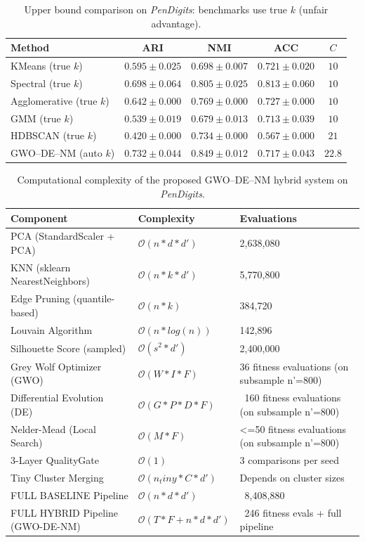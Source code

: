 \begin{table}[htbp]
\centering\small
\caption{Upper bound comparison on \textit{PenDigits}: benchmarks use true $k$ (unfair advantage).}
\label{tab:upper_pendigits}
\begin{tabular}{lcccc}
\toprule
Method & ARI & NMI & ACC & $C$ \\
\midrule
KMeans (true $k$) & $0.595 \pm 0.025$ & $0.698 \pm 0.007$ & $0.721 \pm 0.020$ & $10$ \\
Spectral (true $k$) & $0.698 \pm 0.064$ & $0.805 \pm 0.025$ & $0.813 \pm 0.060$ & $10$ \\
Agglomerative (true $k$) & $0.642 \pm 0.000$ & $0.769 \pm 0.000$ & $0.727 \pm 0.000$ & $10$ \\
GMM (true $k$) & $0.539 \pm 0.019$ & $0.679 \pm 0.013$ & $0.713 \pm 0.039$ & $10$ \\
HDBSCAN (true $k$) & $0.420 \pm 0.000$ & $0.734 \pm 0.000$ & $0.567 \pm 0.000$ & $21$ \\
\midrule
GWO--DE--NM (auto $k$) & $\mathbf{0.732 \pm 0.044}$ & $\mathbf{0.849 \pm 0.012}$ & $\mathbf{0.717 \pm 0.043}$ & $22.8$ \\
\bottomrule
\end{tabular}
\end{table}

\begin{table}[htbp]
\centering
\small
\caption{Computational complexity of the proposed GWO--DE--NM hybrid system on \textit{PenDigits}.}
\label{tab:complexity_pendigits}
\begin{tabular}{lll}
\toprule
Component & Complexity & Evaluations \\
\midrule
PCA (StandardScaler + PCA) & $\mathcal{O}(n * d * d')$ & 2,638,080 \\
KNN (sklearn NearestNeighbors) & $\mathcal{O}(n * k * d')$ & 5,770,800 \\
Edge Pruning (quantile-based) & $\mathcal{O}(n * k)$ & 384,720 \\
Louvain Algorithm & $\mathcal{O}(n * log(n))$ & 142,896 \\
Silhouette Score (sampled) & $\mathcal{O}(s^2 * d')$ & 2,400,000 \\
Grey Wolf Optimizer (GWO) & $\mathcal{O}(W * I * F)$ & 36 fitness evaluations (on subsample n'=800) \\
Differential Evolution (DE) & $\mathcal{O}(G * P * D * F)$ & ~160 fitness evaluations (on subsample n'=800) \\
Nelder-Mead (Local Search) & $\mathcal{O}(M * F)$ & <=50 fitness evaluations (on subsample n'=800) \\
3-Layer QualityGate & $\mathcal{O}(1)$ & 3 comparisons per seed \\
Tiny Cluster Merging & $\mathcal{O}(n_tiny * C * d')$ & Depends on cluster sizes \\
\midrule
FULL BASELINE Pipeline & $\mathcal{O}(n * d * d')$ & ~8,408,880 \\
\midrule
FULL HYBRID Pipeline (GWO-DE-NM) & $\mathcal{O}(T * F + n * d * d')$ & ~246 fitness evals + full pipeline \\
\bottomrule
\end{tabular}
\end{table}